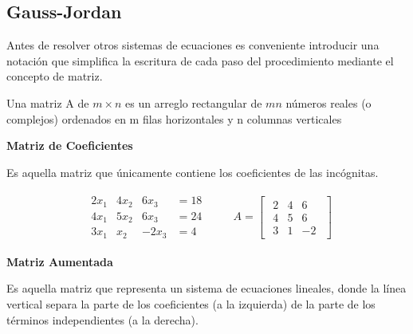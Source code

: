 \documentclass{article}
\begin{document}
\subsection{Gauss-Jordan}

Antes de resolver otros sistemas de ecuaciones es conveniente introducir una notación que simplifica la escritura de cada paso del procedimiento mediante el concepto de matriz.

\begin{tcolorbox}[colback=blue!10!white,colframe=blue!60!black,title=Definición]
    Una matriz A de $m \times n$ es un arreglo rectangular de $mn$ números reales (o complejos) ordenados en m filas horizontales y n columnas verticales
\end{tcolorbox}

\begin{large}
    \textbf{Matriz de Coeficientes}
\end{large}

Es aquella matriz que únicamente contiene los coeficientes de las incógnitas.

\begin{equation*}
    \begin{matrix}
        \begin{array}{rrrr}
            2x_1 & 4x_2 & 6x_3 &=18\\
            4x_1 & 5x_2 & 6x_3 &=24\\
            3x_1 & x_2  & -2x_3 &=4            
        \end{array}
    \end{matrix}
    \quad \quad A = \begin{bmatrix}
        \begin{array}{rrr}
            2 & 4 & 6 \\
            4 & 5 & 6 \\
            3 & 1 & -2         
        \end{array}    
    \end{bmatrix}
\end{equation*}

\begin{large}
    \textbf{Matriz Aumentada}
\end{large}

Es aquella matriz que representa un sistema de ecuaciones lineales, donde la línea vertical separa la parte de los coeficientes (a la izquierda) de la parte de los términos independientes (a la derecha).
\end{document}
